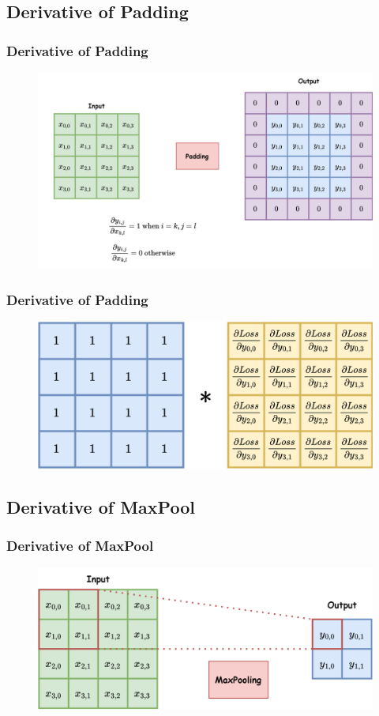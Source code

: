 \documentclass{beamer}
\begin{document}
    \subsection{Derivative of Padding}
    \begin{frame}
	\frametitle{Derivative of Padding}
    	\begin{figure}
    		\includegraphics[width=0.8\linewidth]{"src/conv2.drawio"}
    	\end{figure}
    \end{frame}
	
	\begin{frame}
		\frametitle{Derivative of Padding}
		\begin{figure}
			\includegraphics[width=0.8\linewidth]{"src/conv.drawio3.png"}
		\end{figure}
	\end{frame}
    
    \subsection{Derivative of MaxPool}
    \begin{frame}
    	\frametitle{Derivative of MaxPool}
    	\begin{figure}
    		\includegraphics[width=0.8\linewidth]{"src/conv.drawio (3).png"}
    	\end{figure}
    \end{frame} 
    
\end{document}
